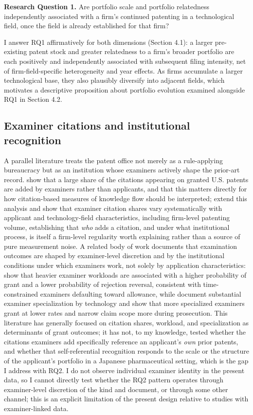 \documentclass[12pt]{article}
\begin{document}
\medskip
\noindent \textbf{Research Question 1.} Are portfolio scale and portfolio relatedness independently associated with a firm's continued patenting in a technological field, once the field is already established for that firm?

\medskip
\noindent I answer RQ1 affirmatively for both dimensions (Section 4.1): a larger pre-existing patent stock and greater relatedness to a firm's broader portfolio are each positively and independently associated with subsequent filing intensity, net of firm-field-specific heterogeneity and year effects. As firms accumulate a larger technological base, they also plausibly diversify into adjacent fields, which motivates a descriptive proposition about portfolio evolution examined alongside RQ1 in Section 4.2.

\subsection{Examiner citations and institutional recognition}

A parallel literature treats the patent office not merely as a rule-applying bureaucracy but as an institution whose examiners actively shape the prior-art record. \citet{alcacergittelman2006} show that a large share of the citations appearing on granted U.S. patents are added by examiners rather than applicants, and that this matters directly for how citation-based measures of knowledge flow should be interpreted; \citet{alcacer2009} extend this analysis and show that examiner citation shares vary systematically with applicant and technology-field characteristics, including firm-level patenting volume, establishing that \emph{who} adds a citation, and under what institutional process, is itself a firm-level regularity worth explaining rather than a source of pure measurement noise. A related body of work documents that examination outcomes are shaped by examiner-level discretion and by the institutional conditions under which examiners work, not solely by application characteristics: \citet{kimoh2017} show that heavier examiner workloads are associated with a higher probability of grant and a lower probability of rejection reversal, consistent with time-constrained examiners defaulting toward allowance, while \citet{righisimcoe2019} document substantial examiner specialization by technology and show that more specialized examiners grant at lower rates and narrow claim scope more during prosecution. This literature has generally focused on citation shares, workload, and specialization as determinants of grant outcomes; it has not, to my knowledge, tested whether the citations examiners add specifically reference an applicant's \emph{own} prior patents, and whether that self-referential recognition responds to the scale or the structure of the applicant's portfolio in a Japanese pharmaceutical setting, which is the gap I address with RQ2. I do not observe individual examiner identity in the present data, so I cannot directly test whether the RQ2 pattern operates through examiner-level discretion of the kind \citet{kimoh2017} and \citet{righisimcoe2019} document, or through some other channel; this is an explicit limitation of the present design relative to studies with examiner-linked data.
\end{document}
